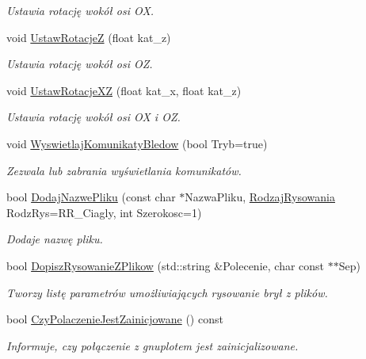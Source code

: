 \begin{DoxyCompactItemize}
\begin{DoxyCompactList}\small\item\em Ustawia rotację wokół osi {\itshape OX}. \end{DoxyCompactList}\item 
void \hyperlink{classPzG_1_1LaczeDoGNUPlota_a458399aa2a8f4b3f00ccd5b272857ea1}{Ustaw\+RotacjeZ} (float kat\+\_\+z)
\begin{DoxyCompactList}\small\item\em Ustawia rotację wokół osi {\itshape OZ}. \end{DoxyCompactList}\item 
void \hyperlink{classPzG_1_1LaczeDoGNUPlota_a94d8527fd78048ed6cb32ffb29e5f903}{Ustaw\+Rotacje\+XZ} (float kat\+\_\+x, float kat\+\_\+z)
\begin{DoxyCompactList}\small\item\em Ustawia rotację wokół osi {\itshape OX} i {\itshape OZ}. \end{DoxyCompactList}\item 
void \hyperlink{classPzG_1_1LaczeDoGNUPlota_a4531e6d166faf2e2c8bb4a54a9c9e1f8}{Wyswietlaj\+Komunikaty\+Bledow} (bool Tryb=true)
\begin{DoxyCompactList}\small\item\em Zezwala lub zabrania wyświetlania komunikatów. \end{DoxyCompactList}\item 
bool \hyperlink{classPzG_1_1LaczeDoGNUPlota_a34bd48f57c0fd69c12bf4127a1cacd8f}{Dodaj\+Nazwe\+Pliku} (const char $\ast$Nazwa\+Pliku, \hyperlink{namespacePzG_a705c92106f39b7d0c34a6739d10ff0b6}{Rodzaj\+Rysowania} Rodz\+Rys=R\+R\+\_\+\+Ciagly, int Szerokosc=1)
\begin{DoxyCompactList}\small\item\em Dodaje nazwę pliku. \end{DoxyCompactList}\item 
bool \hyperlink{classPzG_1_1LaczeDoGNUPlota_ad3d7607946b82aa941d786dcd086d27e}{Dopisz\+Rysowanie\+Z\+Plikow} (std\+::string \&Polecenie, char const $\ast$$\ast$Sep)
\begin{DoxyCompactList}\small\item\em Tworzy listę parametrów umożliwiających rysowanie brył z plików. \end{DoxyCompactList}\item 
bool \hyperlink{classPzG_1_1LaczeDoGNUPlota_af8be8aeb3b1b524fab67d4411cba5b9e}{Czy\+Polaczenie\+Jest\+Zainicjowane} () const
\begin{DoxyCompactList}\small\item\em Informuje, czy połączenie z {\itshape gnuplot\textquotesingle{}em} jest zainicjalizowane. \end{DoxyCompactList}\item 
$$
\end{DoxyCompactItemize}
